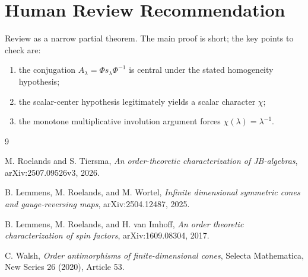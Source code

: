 \documentclass[11pt]{article}
\begin{document}
\section*{Human Review Recommendation}

Review as a narrow partial theorem. The main proof is short; the key points to
check are:
\begin{enumerate}
\item the conjugation \(A_\lambda=\Phi s_\lambda\Phi^{-1}\) is central under the
  stated homogeneity hypothesis;
\item the scalar-center hypothesis legitimately yields a scalar character
  \(\chi\);
\item the monotone multiplicative involution argument forces
  \(\chi(\lambda)=\lambda^{-1}\).
\end{enumerate}

\begin{thebibliography}{9}

M. Roelands and S. Tiersma,
\emph{An order-theoretic characterization of JB-algebras},
arXiv:2507.09526v3, 2026.

B. Lemmens, M. Roelands, and M. Wortel,
\emph{Infinite dimensional symmetric cones and gauge-reversing maps},
arXiv:2504.12487, 2025.

B. Lemmens, M. Roelands, and H. van Imhoff,
\emph{An order theoretic characterization of spin factors},
arXiv:1609.08304, 2017.

C. Walsh,
\emph{Order antimorphisms of finite-dimensional cones},
Selecta Mathematica, New Series 26 (2020), Article 53.

\end{thebibliography}
\end{document}
